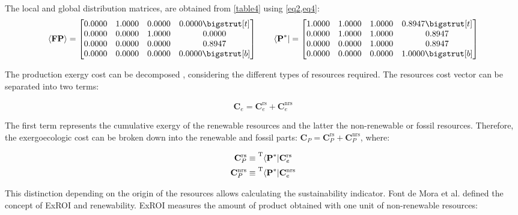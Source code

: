 \documentclass[sustainability,article,submit,moreauthors,pdftex,12pt,a4paper]{mdpi}
\newcommand{\mopcr}[1]{\ensuremath{\left\langle {\textbf{#1}^\ast } \right|}}
\newcommand{\tmopcr}[1]{\ensuremath{\prescript{\mathrm{T}}{}{\left\langle {\textbf{#1}^\ast } \right|}}}
\newcommand{\mbr}[1]{\ensuremath{\langle \textbf{#1} \rangle}}
\newcommand{\vms}[3][\phantom{\ast}]{\ensuremath{\mathbf{#2}_{#3}^\mathrm{#1}}}
\begin{document}
The local and global distribution matrices, are obtained from \cref{table4} using \cref{eq2,eq4}:
\[
\mbr{FP} = \begin{bmatrix}
0.0000 & 1.0000 & 0.0000 & 0.0000 \bigstrut[t]\\
0.0000 & 0.0000 & 1.0000 & 0.0000 \\
0.0000 & 0.0000 & 0.0000 & 0.8947 \\
0.0000 & 0.0000 & 0.0000 & 0.0000 \bigstrut[b]\\
\end{bmatrix}
\qquad
\mopcr{P} = \begin{bmatrix}
1.0000 & 1.0000 & 1.0000 & 0.8947 \bigstrut[t]\\
0.0000 & 1.0000 & 1.0000 & 0.8947 \\
0.0000 & 0.0000 & 1.0000 & 0.8947 \\
0.0000 & 0.0000 & 0.0000 & 1.0000 \bigstrut[b]\\
\end{bmatrix}
\]




 
The production exergy cost can be decomposed \cite{Torres2012b}, considering the different types of resources required. The resources cost vector can be separated into two terms:

\begin{equation}
\label{ce}
\vms{C}{e}=\vms[rs]{C}{e}+\vms[nrs]{C}{e} 
\end{equation}

The first term represents the cumulative exergy of the renewable resources and the latter the non-renewable or fossil resources. Therefore, the exergoecologic cost can be broken down into the renewable and fossil parts: $\vms{C}{P}=\vms[rs]{C}{P}+\vms[nrs]{C}{P}$, where:

\begin{equation}
\label{cpnrs}
\begin{split}
 \vms[rs]{C}{P} &\equiv \tmopcr{P} \vms[rs]{C}{e} \\
 \vms[nrs]{C}{P} &\equiv \tmopcr{P} \vms[nrs]{C}{e}
\end{split}
\end{equation}

This distinction depending on the origin of the resources allows calculating the sustainability indicator. Font de Mora et al. \cite{FontdeMora2012} defined the concept of ExROI and renewability. ExROI measures the amount of product obtained with one unit of non-renewable resources: 
\end{document}
